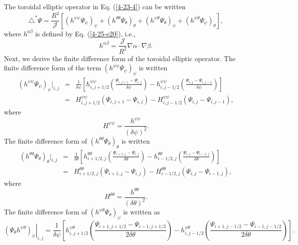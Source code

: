 \documentclass{article}
\newcommand{\nobracket}{}
\begin{document}
The toroidal elliptic operator in Eq. (\ref{4-23-4}) can be written
\begin{equation}
  \triangle^{\ast} \Psi = \frac{R^2}{\mathcal{J}} [(h^{\psi \psi}
  \Psi_{\psi})_{\psi} + (h^{\theta \theta} \Psi_{\theta})_{\theta} + (h^{\psi
  \theta} \Psi_{\theta})_{\psi} + (h^{\psi \theta} \Psi_{\psi})_{\theta}],
\end{equation}
where $h^{a \beta}$ is defined by Eq. (\ref{4-25-e20}), i.e.,
\begin{equation}
  \label{4-25-e20b} h^{\alpha \beta} = \frac{\mathcal{J}}{R^2} \nabla \alpha
  \cdot \nabla \beta .
\end{equation}
Next, we derive the finite difference form of the toroidal elliptic operator.
The finite difference form of the term $(h^{\psi \psi} \Psi_{\psi})_{\psi}$ is
written
\begin{eqnarray}
  \nobracket (h^{\psi \psi} \Psi_{\psi})_{\psi} |_{i, j} & = & \frac{1}{\delta
  \psi} \left[ h^{\psi \psi}_{i, j + 1 / 2} \left( \frac{\Psi_{i, j + 1} -
  \Psi_{i, j}}{\delta \psi} \right) - h_{i, j - 1 / 2}^{\psi \psi} \left(
  \frac{\Psi_{i, j} - \Psi_{i, j - 1}}{\delta \psi} \right) \right]
  \nonumber\\
  & = & H^{\psi \psi}_{i, j + 1 / 2} (\Psi_{i, j + 1} - \Psi_{i, j}) -
  H^{\psi \psi}_{i, j - 1 / 2} (\Psi_{i, j} - \Psi_{i, j - 1}), 
\end{eqnarray}
where
\begin{equation}
  H^{\psi \psi} = \frac{h^{\psi \psi}}{(\delta \psi)^2} .
\end{equation}
The finite difference form of $(h^{\theta \theta} \Psi_{\theta})_{\theta}$ is
written
\begin{eqnarray}
  \nobracket (h^{\theta \theta} \Psi_{\theta})_{\theta} |_{i, j} & = &
  \frac{1}{\delta \theta} \left[ h^{\theta \theta}_{i + 1 / 2, j} \left(
  \frac{\Psi_{i + 1, j} - \Psi_{i, j}}{\delta \theta} \right) - h^{\theta
  \theta}_{i - 1 / 2, j} \left( \frac{\Psi_{i, j} - \Psi_{i - 1, j}}{\delta
  \theta} \right) \right] \nonumber\\
  & = & H^{\theta \theta}_{i + 1 / 2, j} (\Psi_{i + 1, j} - \Psi_{i, j}) -
  H^{\theta \theta}_{i - 1 / 2, j} (\Psi_{i, j} - \Psi_{i - 1, j}), 
\end{eqnarray}
where
\begin{equation}
  H^{\theta \theta} = \frac{h^{\theta \theta}}{(\delta \theta)^2} .
\end{equation}
The finite difference form of $(h^{\psi \theta} \Psi_{\theta})_{\psi}$ is
written as
\begin{equation}
  \left. \label{4-27-e1} (\Psi_{\theta} h^{\psi \theta})_{\psi} \right|_{i, j}
  = \frac{1}{\delta \psi} \left[ h^{\psi \theta}_{i, j + 1 / 2} \left(
  \frac{\Psi_{i + 1, j + 1 / 2} - \Psi_{i - 1, j + 1 / 2}}{2 \delta \theta}
  \right) - h^{\psi \theta}_{i, j - 1 / 2} \left( \frac{\Psi_{i + 1, j - 1 /
  2} - \Psi_{i - 1, j - 1 / 2}}{2 \delta \theta} \right) \right] .
\end{equation}
\end{document}
